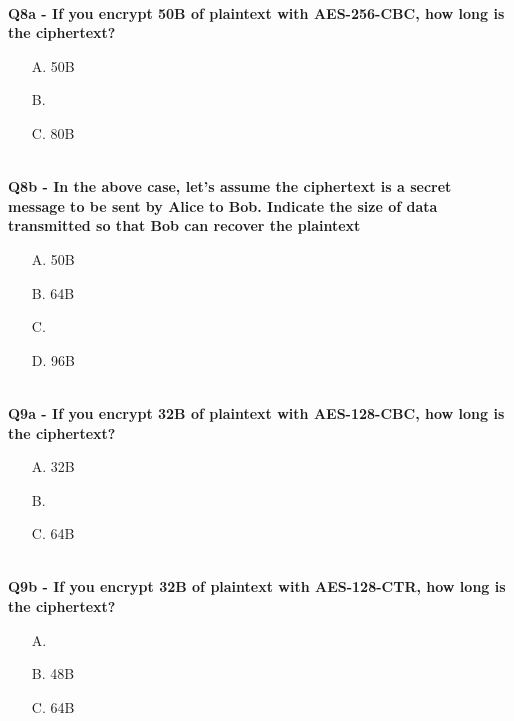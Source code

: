 \textbf{\\Q8a - If you encrypt 50B of plaintext with AES-256-CBC, how long is the ciphertext?}
\begin{enumerate}
	\item[A.] 50B
	\item[B.] 
	\item[C.] 80B
\end{enumerate}


\textbf{\\Q8b - In the above case, let’s assume the ciphertext is a secret message to be sent by Alice to Bob. Indicate the size of data transmitted so that Bob can recover the plaintext}
\begin{enumerate}
	\item[A.] 50B
	\item[B.] 64B
	\item[C.] 
	\item[D.] 96B
\end{enumerate}

\textbf{\\Q9a - If you encrypt 32B of plaintext with AES-128-CBC, how long is the ciphertext?}
\begin{enumerate}
	\item[A.] 32B
	\item[B.] 
	\item[C.] 64B
\end{enumerate}

\textbf{\\Q9b - If you encrypt 32B of plaintext with AES-128-CTR, how long is the ciphertext?}
\begin{enumerate}
	\item[A.] 
	\item[B.] 48B
	\item[C.] 64B
\end{enumerate}

